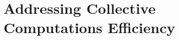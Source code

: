 
\newcommand{\export}{export}
\newcommand{\round}{round}
\newcommand{\RS}{\mathcal{S}}
\newcommand{\RA}{\mathcal{A}}
\newcommand{\RP}{\mathcal{P}}
\newcommand{\RR}{\mathcal{R}}
\newcommand{\RE}{\mathbb{E}}
\newcommand{\decision}[1]{{\color{red} #1}}
\newcommand{\mtext}[1]{\text{\texttt{#1}}}
\newcommand{\revision}[1]{{#1}}
\newenvironment{iequation}{\(}{\). }
\def\tablename{Table}
\sloppypar

\newcommand{\scafiinline}[1]{\lstinline[language=scafi]$#1$}


\chapter{Addressing Collective Computations Efficiency}
\minitoc%
%
\lstset{language=scafi}

